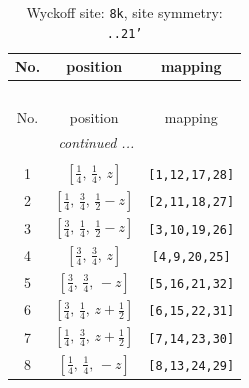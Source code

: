 \documentclass[fleqn,8pt]{jsarticle}
\begin{document}
\begin{longtable}{ccc}
\caption{Wyckoff site: {\tt 8k}, site symmetry: {\tt ..21'}}
 \\
 \hline \hline
No. & position & mapping \\ \hline \endfirsthead

\multicolumn{2}{l}{\tablename\ \thetable{}} \\
 \hline \hline
No. & position & mapping \\ \hline \endhead

 \hline \hline
\multicolumn{2}{r}{\footnotesize\it continued ...} \\ \endfoot

 \hline \hline
\multicolumn{2}{r}{} \\ \endlastfoot

1 & $\left[ \frac{1}{4},\, \frac{1}{4},\, z \right]$ & {\tt [1,12,17,28]} \\ \hline
2 & $\left[ \frac{1}{4},\, \frac{3}{4},\, \frac{1}{2} - z \right]$ & {\tt [2,11,18,27]} \\ \hline
3 & $\left[ \frac{3}{4},\, \frac{1}{4},\, \frac{1}{2} - z \right]$ & {\tt [3,10,19,26]} \\ \hline
4 & $\left[ \frac{3}{4},\, \frac{3}{4},\, z \right]$ & {\tt [4,9,20,25]} \\ \hline
5 & $\left[ \frac{3}{4},\, \frac{3}{4},\, - z \right]$ & {\tt [5,16,21,32]} \\ \hline
6 & $\left[ \frac{3}{4},\, \frac{1}{4},\, z + \frac{1}{2} \right]$ & {\tt [6,15,22,31]} \\ \hline
7 & $\left[ \frac{1}{4},\, \frac{3}{4},\, z + \frac{1}{2} \right]$ & {\tt [7,14,23,30]} \\ \hline
8 & $\left[ \frac{1}{4},\, \frac{1}{4},\, - z \right]$ & {\tt [8,13,24,29]} \\
\end{longtable}
\renewcommand{\arraystretch}{1.2}
\end{document}
